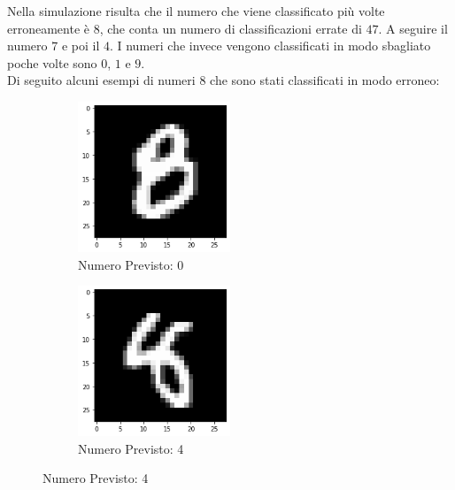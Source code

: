\documentclass[12pt, a4paper]{article}
\begin{document}
Nella simulazione risulta che il numero che viene classificato più volte erroneamente è \(8\), che conta un numero di classificazioni errate di \(47\). A seguire il numero \(7\) e poi il \(4\). I numeri che invece vengono classificati in modo sbagliato poche volte sono \(0\), \(1\) e \(9\).\\
Di seguito alcuni esempi di numeri \(8\) che sono stati classificati in modo erroneo:

\begin{figure}[H]
    \centering
    \begin{subfigure}{.5\textwidth}
        \centering
        \caption{Numero Previsto: 0}
        \includegraphics[width=0.50\textwidth]{otto1.png}
    \end{subfigure}%
    \begin{subfigure}{.5\textwidth}
        \centering
        \caption{Numero Previsto: 4}
        \includegraphics[width=0.50\textwidth]{otto2.png}
    \end{subfigure} 
\end{figure}
\end{document}
